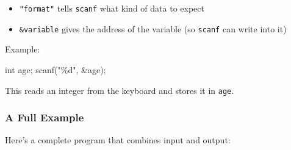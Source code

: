 \documentclass[
  letterpaper,
  DIV=11,
  numbers=noendperiod]{scrreprt}
\newenvironment{Shaded}{\begin{snugshade}}{\end{snugshade}}
\newcommand{\DataTypeTok}[1]{\textcolor[rgb]{0.68,0.00,0.00}{#1}}
\newcommand{\NormalTok}[1]{\textcolor[rgb]{0.00,0.23,0.31}{#1}}
\newcommand{\OperatorTok}[1]{\textcolor[rgb]{0.37,0.37,0.37}{#1}}
\newcommand{\SpecialCharTok}[1]{\textcolor[rgb]{0.37,0.37,0.37}{#1}}
\newcommand{\StringTok}[1]{\textcolor[rgb]{0.13,0.47,0.30}{#1}}
\providecommand{\tightlist}{%
  \setlength{\itemsep}{0pt}\setlength{\parskip}{0pt}}
\begin{document}
\begin{itemize}
\tightlist
\item
  \texttt{"format"} tells \texttt{scanf} what kind of data to expect
\item
  \texttt{\&variable} gives the address of the variable (so
  \texttt{scanf} can write into it)
\end{itemize}

Example:

\begin{Shaded}
\begin{Highlighting}[]
\DataTypeTok{int}\NormalTok{ age}\OperatorTok{;}
\NormalTok{scanf}\OperatorTok{(}\StringTok{"}\SpecialCharTok{\%d}\StringTok{"}\OperatorTok{,} \OperatorTok{\&}\NormalTok{age}\OperatorTok{);}
\end{Highlighting}
\end{Shaded}

This reads an integer from the keyboard and stores it in \texttt{age}.

\subsubsection{A Full Example}\label{a-full-example-3}

Here's a complete program that combines input and output:
\end{document}
